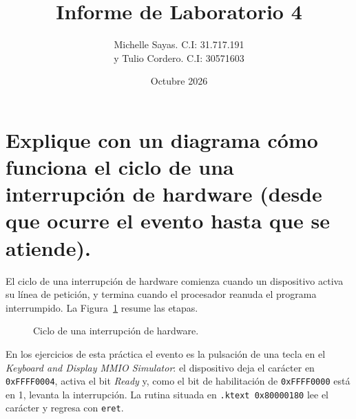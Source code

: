 \documentclass[11pt,a4paper]{article}
\title{Informe de Laboratorio 4}
\author{Michelle Sayas. C.I: 31.717.191\\ y Tulio Cordero. C.I: 30571603}
\date{Octubre 2026}
\begin{document}
\maketitle

\section{Explique con un diagrama cómo funciona el ciclo de una interrupción de hardware (desde que ocurre el evento hasta que se atiende).}

El ciclo de una interrupción de hardware comienza cuando un dispositivo activa su línea de petición, y termina cuando el procesador reanuda el programa interrumpido. La Figura~\ref{fig:ciclo} resume las etapas.

\begin{figure}[h]
\centering
{}
\caption{Ciclo de una interrupción de hardware.}
\label{fig:ciclo}
\end{figure}

En los ejercicios de esta práctica el evento es la pulsación de una tecla en el \emph{Keyboard and Display MMIO Simulator}: el dispositivo deja el carácter en \texttt{0xFFFF0004}, activa el bit \emph{Ready} y, como el bit de habilitación de \texttt{0xFFFF0000} está en 1, levanta la interrupción. La rutina situada en \texttt{.ktext 0x80000180} lee el carácter y regresa con \texttt{eret}.

\end{document}
